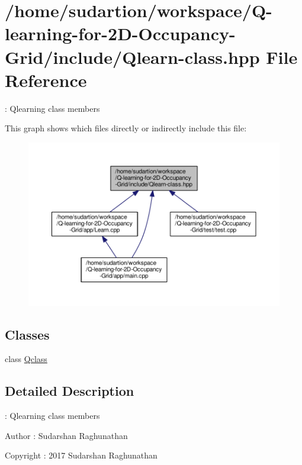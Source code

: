 \hypertarget{Qlearn-class_8hpp}{}\section{/home/sudartion/workspace/\+Q-\/learning-\/for-\/2\+D-\/\+Occupancy-\/\+Grid/include/\+Qlearn-\/class.hpp File Reference}
\label{Qlearn-class_8hpp}


\+: Qlearning class members  


This graph shows which files directly or indirectly include this file\+:
\nopagebreak
\begin{figure}[H]
\begin{center}
\leavevmode
\includegraphics[width=350pt]{Qlearn-class_8hpp__dep__incl}
\end{center}
\end{figure}
\subsection*{Classes}
\begin{DoxyCompactItemize}
\item 
class \hyperlink{classQclass}{Qclass}
\end{DoxyCompactItemize}


\subsection{Detailed Description}
\+: Qlearning class members 

\begin{DoxyAuthor}{Author}
\+: Sudarshan Raghunathan 
\end{DoxyAuthor}
\begin{DoxyCopyright}{Copyright}
\+: 2017 Sudarshan Raghunathan 
\end{DoxyCopyright}
